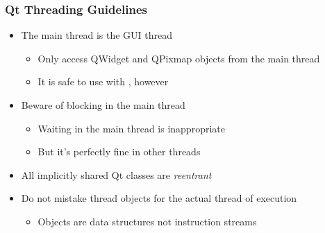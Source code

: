 \begin{slide}
\frametitle{Qt Threading Guidelines}

\begin{itemize}
\item The main thread is the GUI thread
  \begin{itemize}
  \item Only access QWidget and QPixmap objects from the main thread
  \item It is safe to use  with , however
  \end{itemize}
\item Beware of blocking in the main thread
  \begin{itemize}
  \item Waiting in the main thread is inappropriate
  \item But it's perfectly fine in other threads
  \end{itemize}
\item All implicitly shared Qt classes are \textit{reentrant}
\item Do not mistake thread objects for the actual thread of execution
  \begin{itemize}
  \item Objects are data structures not instruction streams
  \end{itemize}
\end{itemize}

\end{slide}


